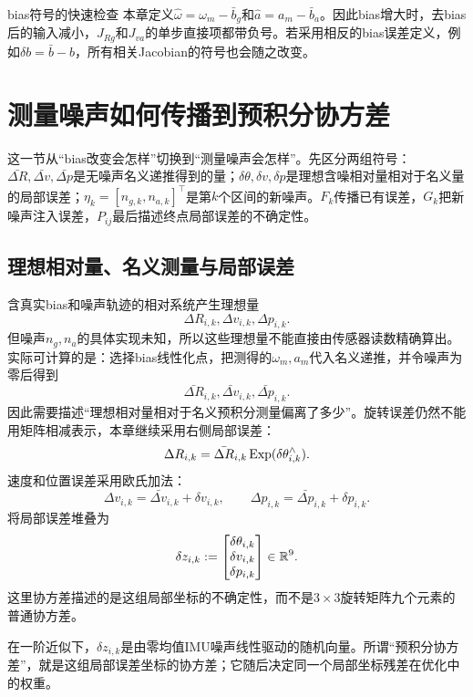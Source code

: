 \begin{imucase}{bias符号的快速检查}
本章定义$\widehat\omega=\omega_m-\bar b_g$和$\widehat a=a_m-\bar b_a$。因此bias增大时，去bias后的输入减小，$J_{R g}$和$J_{v a}$的单步直接项都带负号。若采用相反的bias误差定义，例如$\delta b=\bar b-b$，所有相关Jacobian的符号也会随之改变。
\end{imucase}

\section{测量噪声如何传播到预积分协方差}

这一节从“bias改变会怎样”切换到“测量噪声会怎样”。先区分两组符号：$\bar{\Delta R},\bar{\Delta v},\bar{\Delta p}$是无噪声名义递推得到的量；$\delta\theta,\delta v,\delta p$是理想含噪相对量相对于名义量的局部误差；$\eta_k=[n_{g,k},n_{a,k}]^\top$是第$k$个区间的新噪声。$F_k$传播已有误差，$G_k$把新噪声注入误差，$P_{ij}$最后描述终点局部误差的不确定性。

\subsection{理想相对量、名义测量与局部误差}

含真实bias和噪声轨迹的相对系统产生理想量
\[
    \Delta R_{i,k},\Delta v_{i,k},\Delta p_{i,k}.
\]
但噪声$n_g,n_a$的具体实现未知，所以这些理想量不能直接由传感器读数精确算出。实际可计算的是：选择bias线性化点，把测得的$\omega_m,a_m$代入名义递推，并令噪声为零后得到
\[
    \bar{\Delta R}_{i,k},
    \bar{\Delta v}_{i,k},
    \bar{\Delta p}_{i,k}.
\]
因此需要描述“理想相对量相对于名义预积分测量偏离了多少”。旋转误差仍然不能用矩阵相减表示，本章继续采用右侧局部误差：
\[
    \Delta R_{i,k}
    =\bar{\Delta R}_{i,k}\operatorname{Exp}(\delta\theta_{i,k}^\wedge).
\]
速度和位置误差采用欧氏加法：
\[
    \Delta v_{i,k}
    =\bar{\Delta v}_{i,k}+\delta v_{i,k},
    \qquad
    \Delta p_{i,k}
    =\bar{\Delta p}_{i,k}+\delta p_{i,k}.
\]
将局部误差堆叠为
\[
    \delta z_{i,k}
    :=
    \begin{bmatrix}
        \delta\theta_{i,k}\\
        \delta v_{i,k}\\
        \delta p_{i,k}
    \end{bmatrix}
    \in\mathbb{R}^9.
\]
这里协方差描述的是这组局部坐标的不确定性，而不是$3\times3$旋转矩阵九个元素的普通协方差。

在一阶近似下，$\delta z_{i,k}$是由零均值IMU噪声线性驱动的随机向量。所谓“预积分协方差”，就是这组局部误差坐标的协方差；它随后决定同一个局部坐标残差在优化中的权重。

